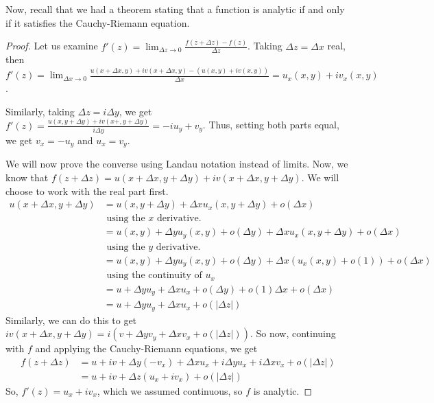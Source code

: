 \documentclass[11pt,leqno,oneside]{amsart}
\numberwithin{thm}{section}
\begin{document}
    Now, recall that we had a theorem stating that a function is analytic if
    and only if it satisfies the Cauchy-Riemann equation.
    \begin{proof}
        Let us examine $f'(z) = \lim_{\Delta z \to 0} \frac{f(z+\Delta z) -
        f(z)}{\Delta z}$. Taking $\Delta z = \Delta x$ real, then $f'(z) =
        \lim_{\Delta x \to 0} \frac{u(x+\Delta x, y)+iv(x+\Delta x,y) -
        (u(x,y)+iv(x,y))}{\Delta x} = u_x(x,y)+iv_x(x,y)$.

        Similarly, taking $\Delta z = i \Delta y$, we get $f'(z) = \frac{u(x,
        y+ \Delta y) + iv(x+,y+\Delta y)}{i\Delta y} = -iu_y+v_y$. Thus,
        setting both parts equal, we get $v_x = -u_y$ and $u_x = v_y$.

        We will now prove the converse using Landau notation instead of limits.
        Now, we know that $f(z+\Delta z) =
        u(x + \Delta x, y + \Delta y) + iv(x+\Delta x, y + \Delta y)$. We will
        choose to work with the real part first.
        \begin{align*}
            u(x+\Delta x, y + \Delta y)  & = u(x, y+ \Delta y) + \Delta x
            u_x(x,y+\Delta y) + o(\Delta x) \\
            \ & \text{ using the }x\text{ derivative.} \\
            \ & = u(x,y) + \Delta y u_y(x,y) + o(\Delta y) + \Delta x
            u_x(x,y+\Delta y) + o(\Delta x) \\
            \ & \text{ using the }y\text{ derivative.} \\
            \ & = u(x,y) + \Delta y u_y(x,y) + o(\Delta y) + \Delta x
            (u_x(x,y)+o(1)) + o(\Delta x) \\
            \ & \text{ using the continuity of }u_x\\
            \ & = u + \Delta y u_y + \Delta x u_x + o(\Delta y) + o(1)\Delta x
            + o(\Delta x) \\
            \ & = u + \Delta y u_y + \Delta x u_x + o(|\Delta z|)
        \end{align*}
        Similarly, we can do this to get $iv(x+\Delta x, y + \Delta y) =
        i(v+\Delta y v_y + \Delta x v_x + o(|\Delta z|))$. So now, continuing
        with $f$ and applying the Cauchy-Riemann equations, we get
        \begin{align*}
            f(z+\Delta z) & = u + iv + \Delta y (-v_x) + \Delta x u_x + i\Delta
            y u_x + i \Delta x v_x + o(|\Delta z|) \\
            \ & = u + iv + \Delta z(u_x+iv_x)+o(|\Delta z|)
        \end{align*}
        So, $f'(z) = u_x+iv_x$, which we assumed continuous, so $f$ is analytic.
    \end{proof}
\end{document}
